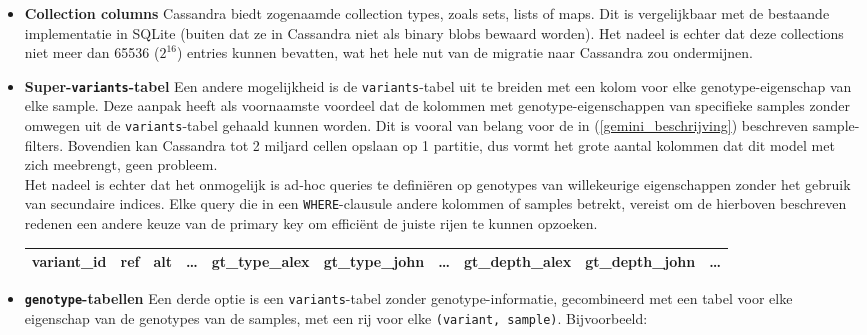 \begin{itemize}

\item \textbf{Collection columns} Cassandra biedt zogenaamde collection types, zoals sets, lists of maps. Dit is vergelijkbaar met de bestaande implementatie in SQLite (buiten dat ze in Cassandra niet als binary blobs bewaard worden). Het nadeel is echter dat deze collections niet meer dan 65536 ($2^{16}$) entries kunnen bevatten, wat het hele nut van de migratie naar Cassandra zou ondermijnen.

\item \textbf{Super-\texttt{variants}-tabel} Een andere mogelijkheid is de \texttt{variants}-tabel uit te breiden met een kolom voor elke genotype-eigenschap van elke sample. Deze aanpak heeft als voornaamste voordeel dat de kolommen met genotype-eigenschappen van specifieke samples zonder omwegen uit de \texttt{variants}-tabel gehaald kunnen worden. Dit is vooral van belang voor de in (\ref{gemini_beschrijving}) beschreven sample-filters. Bovendien kan Cassandra tot 2 miljard cellen opslaan op 1 partitie, dus vormt het grote aantal kolommen dat dit model met zich meebrengt, geen probleem.\\
Het nadeel is echter dat het onmogelijk is ad-hoc queries te defini\"eren op genotypes van willekeurige eigenschappen zonder het gebruik van secundaire indices. Elke query die in een \texttt{WHERE}-clausule andere kolommen of samples betrekt, vereist om de hierboven beschreven redenen een andere keuze van de primary key om effici\"ent de juiste rijen te kunnen opzoeken.

\begin{table}[!htbp]
\begin{tabular}{@{}|l|l|l|l|l|l|l|l|l|l|@{}}
\toprule
\color{green} variant\_id & ref & alt & \ldots & gt\_type\_alex & gt\_type\_john & \ldots & gt\_depth\_alex & gt\_depth\_john & \ldots \\ \bottomrule
\end{tabular}
\end{table}

\item \textbf{\texttt{genotype}-tabellen} Een derde optie is een \texttt{variants}-tabel zonder genotype-informatie, gecombineerd met een tabel voor elke eigenschap van de genotypes van de samples, met een rij voor elke \texttt{(variant, sample)}. Bijvoorbeeld:\\

\begin{itemize}


\end{itemize}
\end{itemize}
